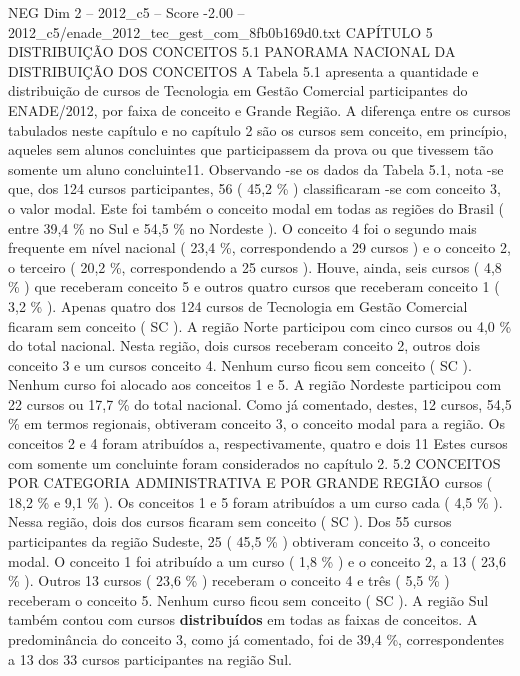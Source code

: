 \begin{textsample}{NEG Dim 2 – 2012\_c5 – Score -2.00 – 2012\_c5/enade\_2012\_tec\_gest\_com\_8fb0b169d0.txt}  \label{ex:f2_neg_077}
CAPÍTULO 5 DISTRIBUIÇÃO DOS CONCEITOS 5.1 PANORAMA NACIONAL DA DISTRIBUIÇÃO DOS CONCEITOS A Tabela 5.1 apresenta a quantidade e distribuição de cursos de Tecnologia em Gestão Comercial participantes do ENADE/2012, por faixa de conceito e Grande Região.
A diferença entre os cursos tabulados neste capítulo e no capítulo 2 são os cursos sem conceito, em princípio, aqueles sem alunos concluintes que participassem da prova ou que tivessem tão somente um aluno concluinte11.
Observando -se os dados da Tabela 5.1, nota -se que, dos 124 cursos participantes, 56 ( 45,2 \% ) classificaram -se com conceito 3, o valor modal.
Este foi também o conceito modal em todas as regiões do Brasil ( entre 39,4 \% no Sul e 54,5 \% no Nordeste ).
O conceito 4 foi o segundo mais frequente em nível nacional ( 23,4 \%, correspondendo a 29 cursos ) e o conceito 2, o terceiro ( 20,2 \%, correspondendo a 25 cursos ).
Houve, ainda, seis cursos ( 4,8 \% ) que receberam conceito 5 e outros quatro cursos que receberam conceito 1 ( 3,2 \% ).
Apenas quatro dos 124 cursos de Tecnologia em Gestão Comercial ficaram sem conceito ( SC ).
A região Norte participou com cinco cursos ou 4,0 \% do total nacional.
Nesta região, dois cursos receberam conceito 2, outros dois conceito 3 e um cursos conceito 4.
Nenhum curso ficou sem conceito ( SC ).
Nenhum curso foi alocado aos conceitos 1 e 5.
A região Nordeste participou com 22 cursos ou 17,7 \% do total nacional.
Como já comentado, destes, 12 cursos, 54,5 \% em termos regionais, obtiveram conceito 3, o conceito modal para a região.
Os conceitos 2 e 4 foram atribuídos a, respectivamente, quatro e dois 11 Estes cursos com somente um concluinte foram considerados no capítulo 2. 5.2 CONCEITOS POR CATEGORIA ADMINISTRATIVA E POR GRANDE REGIÃO cursos ( 18,2 \% e 9,1 \% ).
Os conceitos 1 e 5 foram atribuídos a um curso cada ( 4,5 \% ).
Nessa região, dois dos cursos ficaram sem conceito ( SC ).
Dos 55 cursos participantes da região Sudeste, 25 ( 45,5 \% ) obtiveram conceito 3, o conceito modal.
O conceito 1 foi atribuído a um curso ( 1,8 \% ) e o conceito 2, a 13 ( 23,6 \% ).
Outros 13 cursos ( 23,6 \% ) receberam o conceito 4 e três ( 5,5 \% ) receberam o conceito 5.
Nenhum curso ficou sem conceito ( SC ).
A região Sul também contou com cursos \textbf{distribuídos} em todas as faixas de conceitos.
A predominância do conceito 3, como já comentado, foi de 39,4 \%, correspondentes a 13 dos 33 cursos participantes na região Sul.

\end{textsample}
